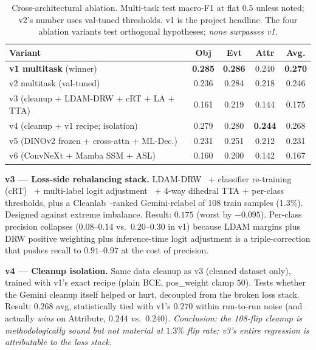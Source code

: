 \documentclass[journal]{IEEEtran}
\begin{document}
\begin{table}[!t]
\caption{Cross-architectural ablation. Multi-task test macro-F1 at flat $0.5$ unless noted; v2's number uses val-tuned thresholds. v1 is the project headline. The four ablation variants test orthogonal hypotheses; \emph{none surpasses v1}.}
\label{tab:ablation}
\centering
\small
\begin{tabular}{@{}lcccc@{}}
\toprule
Variant & Obj & Evt & Attr & \textbf{Avg.} \\
\midrule
\textbf{v1 multitask} (winner) & \textbf{0.285} & \textbf{0.286} & 0.240 & \textbf{0.270} \\
v2 multitask (val-tuned) & 0.236 & 0.284 & 0.218 & 0.246 \\
\midrule
v3 (cleanup + LDAM-DRW + cRT + LA + TTA) & 0.161 & 0.219 & 0.144 & 0.175 \\
v4 (cleanup + v1 recipe; isolation) & 0.279 & 0.280 & \textbf{0.244} & 0.268 \\
v5 (DINOv2 frozen + cross-attn + ML-Dec.) & 0.231 & 0.251 & 0.212 & 0.231 \\
v6 (ConvNeXt + Mamba SSM + ASL) & 0.160 & 0.200 & 0.142 & 0.167 \\
\bottomrule
\end{tabular}
\end{table}

\textbf{v3 — Loss-side rebalancing stack.} LDAM-DRW~\cite{cao2019ldam} + classifier re-training (cRT)~\cite{kang2020decoupling} + multi-label logit adjustment~\cite{menon2021logitadjust} + 4-way dihedral TTA + per-class thresholds, plus a Cleanlab~\cite{northcutt2021cleanlab}-ranked Gemini-relabel of 108 train samples (1.3\%). Designed against extreme imbalance. Result: $0.175$ (worst by $-0.095$). Per-class precision collapses ($0.08$--$0.14$ vs.\ $0.20$--$0.30$ in v1) because LDAM margins plus DRW positive weighting plus inference-time logit adjustment is a triple-correction that pushes recall to $0.91$--$0.97$ at the cost of precision.

\textbf{v4 — Cleanup isolation.} Same data cleanup as v3 (cleaned dataset only), trained with v1's exact recipe (plain BCE, pos\_weight clamp $50$). Tests whether the Gemini cleanup itself helped or hurt, decoupled from the broken loss stack. Result: $0.268$ avg, statistically tied with v1's $0.270$ within run-to-run noise (and actually \emph{wins} on Attribute, $0.244$ vs.\ $0.240$). \emph{Conclusion: the 108-flip cleanup is methodologically sound but not material at $1.3\%$ flip rate; v3's entire regression is attributable to the loss stack.}
\end{document}
